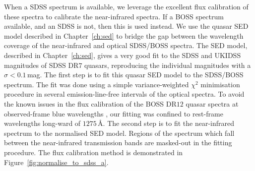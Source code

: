 When a SDSS spectrum is available, we leverage the excellent flux calibration of these spectra to calibrate the near-infrared spectra. 
If a BOSS spectrum available, and an SDSS is not, then this is used instead. 
We use the quasar SED model described in Chapter~\ref{ch:sed} to bridge the gap between the wavelength coverage of the near-infrared and optical SDSS/BOSS spectra.
The SED model, described in Chapter~\ref{ch:sed}, gives a very good fit to the SDSS and UKIDSS magnitudes of SDSS DR$7$ quasars, reproducing the individual magnitudes with a $\sigma <0.1$\,mag.
The first step is to fit this quasar SED model to the SDSS/BOSS spectrum. 
The fit was done using a simple variance-weighted $\chi^2$ minimisation procedure in several emission-line-free intervals of the optical spectra.   
To avoid the known issues in the flux calibration of the BOSS DR$12$ quasar spectra at observed-frame blue wavelengths \citep{lee13}, our fitting was confined to rest-frame wavelengths long-ward of $1275$\,\AA. 
The second step is to fit the near-infrared spectrum to the normalised SED model. 
Regions of the spectrum which fall between the near-infrared transmission bands are masked-out in the fitting procedure. 
The flux calibration method is demonstrated in Figure~\ref{fig:normalise_to_sdss_a}. 

